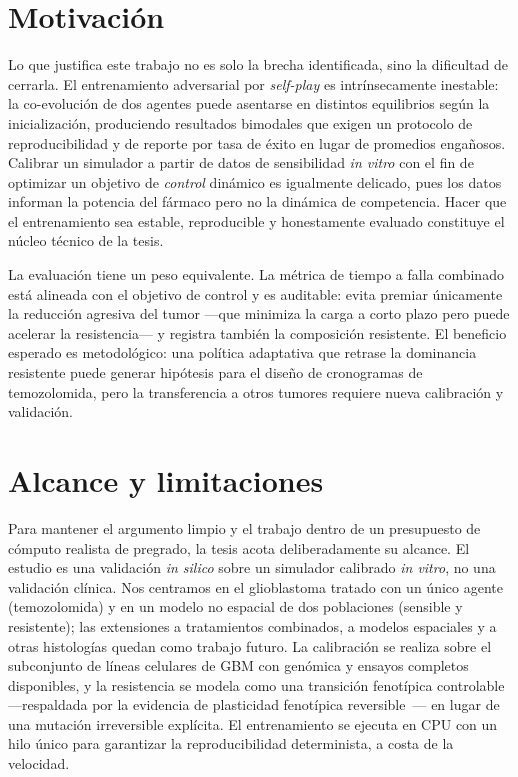 \section{Motivación}
\label{sec:motivacion}

Lo que justifica este trabajo no es solo la brecha identificada, sino la dificultad de cerrarla. El entrenamiento adversarial por \emph{self-play} es intrínsecamente inestable: la co-evolución de dos agentes puede asentarse en distintos equilibrios según la inicialización, produciendo resultados bimodales que exigen un protocolo de reproducibilidad y de reporte por tasa de éxito en lugar de promedios engañosos. Calibrar un simulador a partir de datos de sensibilidad \emph{in vitro} con el fin de optimizar un objetivo de \emph{control} dinámico es igualmente delicado, pues los datos informan la potencia del fármaco pero no la dinámica de competencia. Hacer que el entrenamiento sea estable, reproducible y honestamente evaluado constituye el núcleo técnico de la tesis.

La evaluación tiene un peso equivalente. La métrica de tiempo a falla combinado está alineada con el objetivo de control y es auditable: evita premiar únicamente la reducción agresiva del tumor ---que minimiza la carga a corto plazo pero puede acelerar la resistencia--- y registra también la composición resistente. El beneficio esperado es metodológico: una política adaptativa que retrase la dominancia resistente puede generar hipótesis para el diseño de cronogramas de temozolomida, pero la transferencia a otros tumores requiere nueva calibración y validación.

\section{Alcance y limitaciones}
\label{sec:alcance}

Para mantener el argumento limpio y el trabajo dentro de un presupuesto de cómputo realista de pregrado, la tesis acota deliberadamente su alcance. El estudio es una validación \emph{in silico} sobre un simulador calibrado \emph{in vitro}, no una validación clínica. Nos centramos en el glioblastoma tratado con un único agente (temozolomida) y en un modelo no espacial de dos poblaciones (sensible y resistente); las extensiones a tratamientos combinados, a modelos espaciales y a otras histologías quedan como trabajo futuro. La calibración se realiza sobre el subconjunto de líneas celulares de GBM con genómica y ensayos completos disponibles, y la resistencia se modela como una transición fenotípica controlable ---respaldada por la evidencia de plasticidad fenotípica reversible~\cite{Boumahdi2019}--- en lugar de una mutación irreversible explícita. El entrenamiento se ejecuta en CPU con un hilo único para garantizar la reproducibilidad determinista, a costa de la velocidad.

